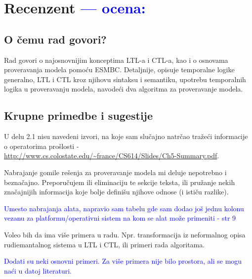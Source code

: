 \documentclass[a4paper]{report}
\newcommand{\odgovor}[1]{\textcolor{blue}{#1}}
\begin{document}
\chapter{Recenzent \odgovor{--- ocena:} }


\section{O čemu rad govori?}

Rad govori o najosnovnijim konceptima LTL-a i CTL-a, kao i o osnovama proveravanja modela pomoću ESMBC.
Detaljnije, opisuje temporalne logike generalno, LTL i CTL kroz njihovu sintaksu i semantiku, 
upotrebu temporalnih logika u proveravanju modela, navodeći dva algoritma za proveravanje modela.


\section{Krupne primedbe i sugestije}

U delu 2.1 nisu navedeni izvori, na koje sam slučajno natrčao tražeći informacije o operatorima
prošlosti - \url{http://www.cs.colostate.edu/~france/CS614/Slides/Ch5-Summary.pdf}.

Nabrajanje gomile rešenja za proveravanje modela mi deluje nepotrebno i beznačajno. Preporučujem
ili eliminaciju te sekcije teksta, ili pružanje nekih značajnijih informacija koje bolje definišu
njihove odnose (i ističu razlike).

\odgovor{Umesto nabrajanja alata, napravio sam tabelu gde sam dodao još jednu kolonu vezanu za platformu/operativni sistem na kom se alat može primeniti - str 9}

Voleo bih da ima više primera u radu. Npr. transformacija iz neformalnog opisa rudiemantalnog 
sistema u LTL i CTL, ili primeri rada algoritama.

\odgovor{Dodati su neki osnovni primeri. Za više primera nije bilo prostora, ali se mogu naći u datoj literaturi.}
\end{document}
